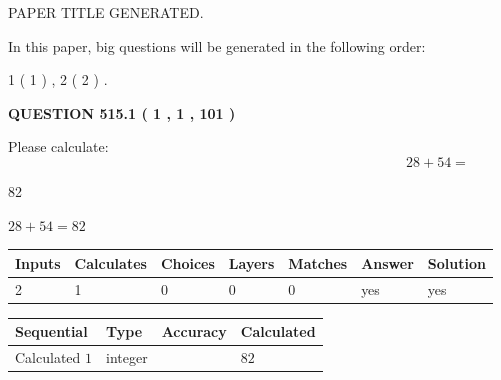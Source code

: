 \documentclass[12pt]{article}
\begin{document}
   
 PAPER TITLE GENERATED.
   
   
   
\vspace{0.2in}
   
In this paper, big questions will be generated in the following order: 
   
   
   1 ( 1 )
 ,
   2 ( 2 )
 .
  
\vspace{0.2in}
  
{\textbf{\Large{QUESTION
515.1 
 ( 1 , 1 , 101 )
}}}
  
  
 
Please calculate:
\begin{equation}
28 +  %
54 = \nonumber
\end{equation}
 
 
 
\noindent{}
 
 

82
 
 
\noindent{}
 
 

 
 
 
\noindent{}
 
 

$ %
28 +  %
54=   %
82$
 
 
\noindent{}
 
 

 
   
   
   
   
\noindent\begin{tabular}{|l|l|l|l|l|l|l|}
 \hline
Inputs & Calculates & Choices & Layers & Matches & Answer & Solution \\ \hline
 2  & 
 1  & 
 0
  & 
 0  & 
 0  & 
  yes & 
  yes 
  \\ \hline
 \end{tabular}
   
   
   
   
\noindent{}
   
   
  
  
\noindent\begin{tabular}{|l|l|l|l|}
\hline
 Sequential & Type & Accuracy & Calculated \\ 
\hline
 
 
  Calculated $  1 $ & integer &  & 
  $ 82 $ 
 \\  \hline  
 \end{tabular}
   
\end{document}
